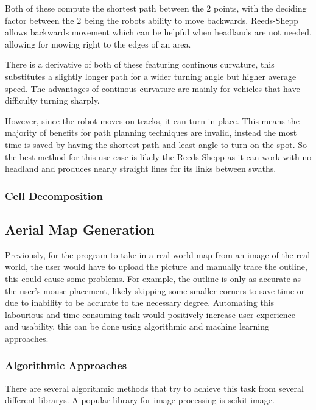 \documentclass[final]{cmpreport_02}
\begin{document}
Both of these compute the shortest path between the 2 points, with the deciding factor between the 2 being the robots ability to move backwards.
Reeds-Shepp allows backwards movement which can be helpful when headlands are not needed, allowing for mowing right to the edges of an area.

There is a derivative of both of these featuring continous curvature, this substitutes a slightly longer path for a wider turning angle but higher average speed.
The advantages of continous curvature are mainly for vehicles that have difficulty turning sharply.

However, since the robot moves on tracks, it can turn in place.
This means the majority of benefits for path planning techniques are invalid, instead the most time is saved by having the shortest path and least angle to turn on the spot.
So the best method for this use case is likely the Reeds-Shepp as it can work with no headland and produces nearly straight lines for its links between swaths.


\subsubsection{Cell Decomposition}






\subsection{Aerial Map Generation}
Previously, for the program to take in a real world map from an image of the real world, the user would have to upload the picture and manually trace the outline, this could cause some problems.
For example, the outline is only as accurate as the user's mouse placement, likely skipping some smaller corners to save time or due to inability to be accurate to the necessary degree.
Automating this labourious and time consuming task would positively increase user experience and usability, this can be done using algorithmic and machine learning approaches.

\subsubsection{Algorithmic Approaches}
There are several algorithmic methods that try to achieve this task from several different librarys. A popular library for image processing is scikit-image.
\end{document}

